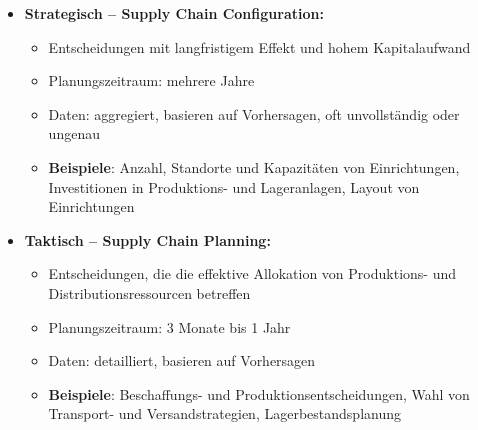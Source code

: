 \begin{itemize}
	\item \textbf{Strategisch – Supply Chain Configuration:}
	\begin{itemize}
		\item Entscheidungen mit langfristigem Effekt und hohem Kapitalaufwand
		\item Planungszeitraum: mehrere Jahre
		\item Daten: aggregiert, basieren auf Vorhersagen, oft unvollständig oder ungenau
		\item \textbf{Beispiele}: Anzahl, Standorte und Kapazitäten von Einrichtungen, Investitionen in Produktions- und Lageranlagen, Layout von Einrichtungen
	\end{itemize}
	\item \textbf{Taktisch – Supply Chain Planning:}
	\begin{itemize}
		\item Entscheidungen, die die effektive Allokation von Produktions- und
		Distributionsressourcen betreffen
		\item Planungszeitraum: 3 Monate bis 1 Jahr
		\item Daten: detailliert, basieren auf Vorhersagen
		\item \textbf{Beispiele}: Beschaffungs- und Produktionsentscheidungen, Wahl von Transport- und Versandstrategien, Lagerbestandsplanung
	\end{itemize}
\end{itemize}